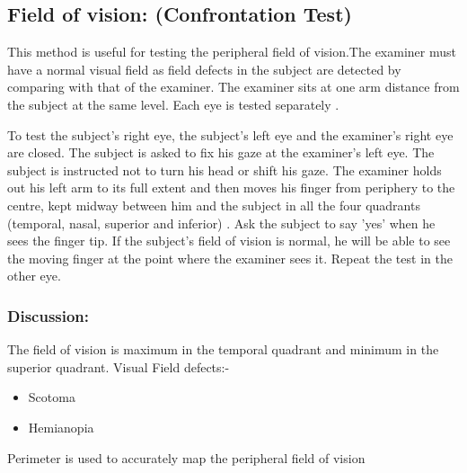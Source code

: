 \documentclass[a4paper,12pt,openany,oneside]{book}
\begin{document}
			\subsection*{Field of vision: (Confrontation Test)}
			This method is useful for testing the peripheral field of vision.The examiner must have a normal visual field as field defects in the subject are detected by comparing with that of the examiner. The examiner sits at one arm distance from the subject at the same level. Each eye is tested separately .
			\par
			To test the subject's right eye, the subject’s left eye and the examiner's right eye are closed. The subject is asked to fix his gaze at the examiner’s left eye. The subject is instructed not to turn his head or shift his gaze. The examiner holds out his left arm to its full extent and then moves his finger from periphery to the centre, kept midway between him and the subject in all the four quadrants (temporal, nasal, superior and inferior) . Ask the subject to say 'yes' when he sees the finger tip. If the subject's field of vision is normal, he will be able to see the moving finger at the point where the examiner sees it. Repeat the test in the other eye.
			\subsubsection*{Discussion:}
			The field of vision is maximum in the temporal quadrant and minimum in the superior quadrant.
			Visual Field defects:-
			\begin{itemize}
					\itemsep0em
					\item{Scotoma}
					\item{Hemianopia}
			\end{itemize}
			Perimeter is used to accurately map the peripheral field of vision
\end{document}
